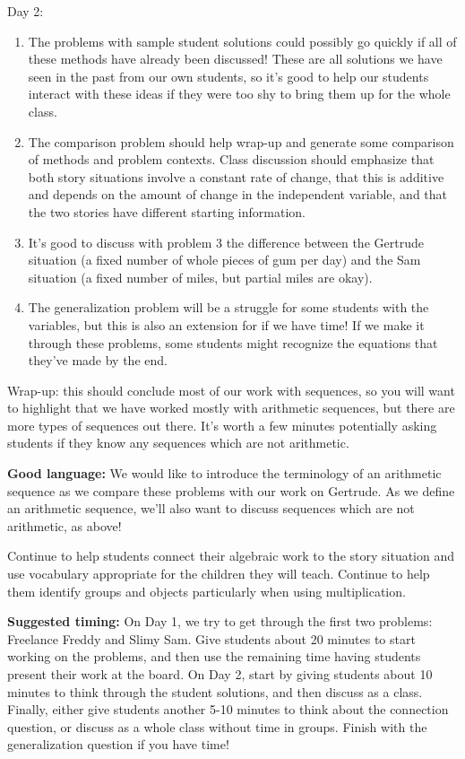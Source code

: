 \documentclass[nooutcomes, noauthor, handout]{ximera}
\begin{document}
\begin{instructorNotes}
Day 2:
\begin{enumerate}
\item The problems with sample student solutions could possibly go quickly if all of these methods have already been discussed! These are all solutions we have seen in the past from our own students, so it's good to help our students interact with these ideas if they were too shy to bring them up for the whole class.
\item  The comparison problem should help wrap-up and generate some comparison of methods and problem contexts.  Class discussion should emphasize  that both story situations involve a constant rate of change, that this is additive and depends on the amount of change in the independent variable, and that the two stories have different starting information.  
\item It's good to discuss with problem 3 the difference between the Gertrude situation (a fixed number of whole pieces of gum per day) and the Sam situation (a fixed number of miles, but partial miles are okay).
\item The generalization problem will be a struggle for some students with the variables, but this is also an extension for if we have time! If we make it through these problems, some students might recognize the equations that they've made by the end.
\end{enumerate}


Wrap-up: this should conclude most of our work with sequences, so you will want to highlight that we have worked mostly with arithmetic sequences, but there are more types of sequences out there. It's worth a few minutes potentially asking students if they know any sequences which are not arithmetic.



{\bf Good language:} We would like to introduce the terminology of an arithmetic sequence as we compare these problems with our work on Gertrude. As we define an arithmetic sequence, we'll also want to discuss sequences which are not arithmetic, as above!

Continue to help students connect their algebraic work to the story situation and use vocabulary appropriate for the children they will teach. Continue to help them identify groups and objects particularly when using multiplication.





{\bf Suggested timing:} On Day 1, we try to get through the first two problems: Freelance Freddy and  Slimy Sam. Give students about 20 minutes to start working on the problems, and then use the remaining time having students present their work at the board. On Day 2, start by giving students about 10 minutes to think through the student solutions, and then discuss as a class. Finally, either give students another 5-10 minutes to think about the connection question, or discuss as a whole class without time in groups. Finish with the generalization question if you have time!
\end{instructorNotes}
\end{document}
